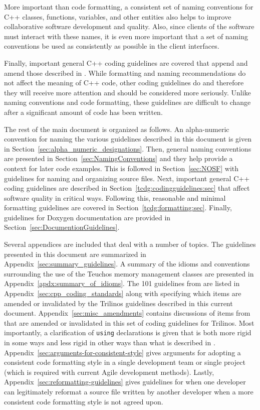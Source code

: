 More important than code formatting, a consistent set of naming conventions
for C++ classes, functions, variables, and other entities also helps to
improve collaborative software development and quality.  Also, since clients
of the software must interact with these names, it is even more important that
a set of naming conventions be used as consistently as possible in the client
interfaces.

Finally, important general C++ coding guidelines are covered that
append and amend those described in {}\cite{C++CodingStandards05}.
While formatting and naming recommendations do not affect the meaning
of C++ code, other coding guidelines do and therefore they will
receive more attention and should be considered more seriously.
Unlike naming conventions and code formatting, these guidelines are
difficult to change after a significant amount of code has been
written.

The rest of the main document is organized as follows.  An
alpha-numeric convention for naming the various guidelines described
in this document is given in
Section~\ref{sec:alpha_numeric_designations}.  Then, general naming
conventions are presented in Section~\ref{sec:NamingConventions} and
they help provide a context for later code examples.  This is followed
in Section~\ref{sec:NOSF} with guidelines for naming and organizing
source files.  Next, important general C++ coding guidelines are
described in Section~\ref{tcdg:codingguidelines:sec}
that affect software quality in critical ways.  Following this,
reasonable and minimal formatting guidelines are covered in
Section~\ref{tcdg:formatting:sec}.  Finally,
guidelines for Doxygen documentation are provided in
Section~\ref{sec:DocumentionGuidelines}.

Several appendices are included that deal with a number of topics.
The guidelines presented in this document are summarized in
Appendix~\ref{sec:summary_guidelines}.  A summary of the idioms and
conventions surrounding the use of the Teuchos memory management
classes are presented in Appendix~\ref{apdx:summary_of_idioms}.  The
101 guidelines from {}\cite{C++CodingStandards05} are listed in
Appendix~\ref{sec:cpp_coding_standards} along with specifying which
items are amended or invalidated by the Trilinos guidelines described
in this current document.  Appendix~\ref{sec:misc_amendments} contains
discussions of items from {}\cite{C++CodingStandards05} that are
amended or invalidated in this set of coding guidelines for Trilinos.
Most importantly, a clarification of {}\texttt{using} declarations is
given that is both more rigid in some ways and less rigid in other
ways than what is described in {}\cite[Item 59]{C++CodingStandards05}.
Appendix~\ref{sec:arguments-for-consistent-style} gives arguments for
adopting a consistent code formatting style in a single development
team or single project (which is required with current Agile
development methods).  Lastly,
Appendix~\ref{sec:reformatting-guidelines} gives guidelines for when
one developer can legitimately reformat a source file written by
another developer when a more consistent code formatting style is not
agreed upon.


